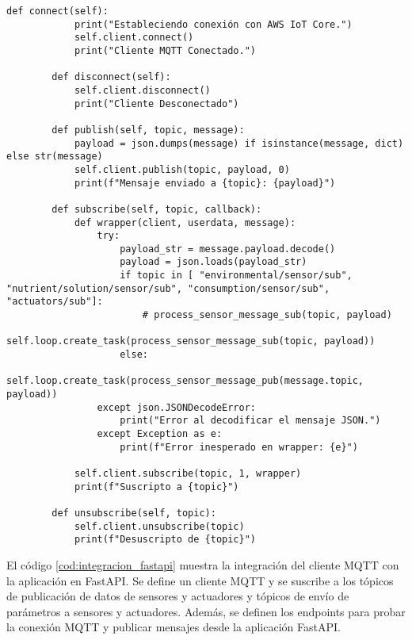 \begin{lstlisting}[label=cod:mqtt_connection,caption=Definición de Clase para cliente MQTT., language=PythonUTF8]
        def connect(self):
            print("Estableciendo conexión con AWS IoT Core.")
            self.client.connect()
            print("Cliente MQTT Conectado.")

        def disconnect(self):
            self.client.disconnect()
            print("Cliente Desconectado")

        def publish(self, topic, message):
            payload = json.dumps(message) if isinstance(message, dict) else str(message)
            self.client.publish(topic, payload, 0)
            print(f"Mensaje enviado a {topic}: {payload}")

        def subscribe(self, topic, callback):
            def wrapper(client, userdata, message):
                try:
                    payload_str = message.payload.decode()
                    payload = json.loads(payload_str)
                    if topic in [ "environmental/sensor/sub", "nutrient/solution/sensor/sub", "consumption/sensor/sub", "actuators/sub"]:
                        # process_sensor_message_sub(topic, payload)
                        self.loop.create_task(process_sensor_message_sub(topic, payload))
                    else:
                        self.loop.create_task(process_sensor_message_pub(message.topic, payload))
                except json.JSONDecodeError:
                    print("Error al decodificar el mensaje JSON.")
                except Exception as e:
                    print(f"Error inesperado en wrapper: {e}")
            
            self.client.subscribe(topic, 1, wrapper)
            print(f"Suscripto a {topic}")

        def unsubscribe(self, topic):
            self.client.unsubscribe(topic)
            print(f"Desuscripto de {topic}")

\end{lstlisting}

El código \ref{cod:integracion_fastapi} muestra la integración del cliente MQTT
con la aplicación en FastAPI. Se define un cliente MQTT y se suscribe a los
tópicos de publicación de datos de sensores y actuadores y tópicos de envío de
parámetros a sensores y actuadores. Además, se definen los endpoints para
probar la conexión MQTT y publicar mensajes desde la aplicación FastAPI.

